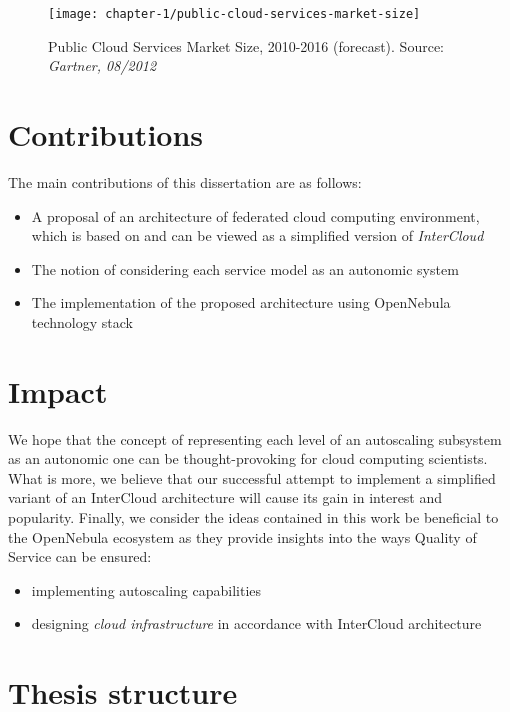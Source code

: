 \begin{figure}[!ht]
  \begin{center}
    \texttt{[image: chapter-1/public-cloud-services-market-size]}
  \end{center}
  \caption{Public Cloud Services Market Size, 2010-2016 (forecast). Source: \textit{Gartner, 08/2012}}
  \label{ch1:public-cloud-services-market-size}
\end{figure}

\section{Contributions}
The main contributions of this dissertation are as follows:
\begin{itemize}
  \item A proposal of an architecture of federated cloud computing environment, which is based on and can be viewed as a simplified version of \emph{InterCloud}
  \item The notion of considering each service model as an autonomic system
  \item The implementation of the proposed architecture using OpenNebula technology stack
\end{itemize}

\section{Impact}
We hope that the concept of representing each level of an autoscaling subsystem as an autonomic one can be thought-provoking for cloud computing scientists.  What is more, we believe that our successful attempt to implement a simplified variant of an InterCloud architecture will cause its gain in interest and popularity. 
Finally, we consider the ideas contained in this work be beneficial to the OpenNebula ecosystem as they provide insights into the ways Quality of Service can be ensured:
\begin{itemize}
  \item implementing autoscaling capabilities
  \item designing \emph{cloud infrastructure} in accordance with InterCloud architecture
\end{itemize}

\section{Thesis structure}
